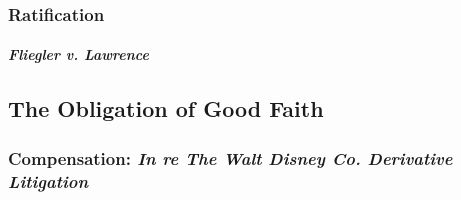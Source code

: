 \subsubsection{Ratification}

\paragraph{\emph{Fliegler v. Lawrence}}


\newpage %

\subsection{The Obligation of Good Faith}

\subsubsection{Compensation: \emph{In re The Walt Disney Co. Derivative Litigation}}

